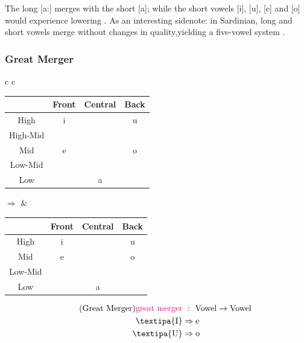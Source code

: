 \documentclass{report}[12pt]
\begin{document}
The long [a:] merges with the short [a]; while the short vowels [i], [u], [e] and [o] would experience lowering \parencite[p.~13]{romance_his}. As an interesting sidenote: in Sardinian, long and short vowels merge without changes in quality,yielding a five-vowel system \parencite[p.~112]{lloyd_spanish}.

\subsubsection{Great Merger}\label{sec:great_merger}

\begin{tcolorbox}
  \begin{tabular}{c c}
    \begin{tabular}{|c|c|c|c|}
      \hline
      & Front & Central & Back \\
      \hline
      High & i & & u \\
      \hline
      High-Mid & \cellcolor{gray} \textipa{I} & & \cellcolor{gray} \textipa{U} \\
      \hline
      Mid & e & & o \\
      \hline
      Low-Mid & \textipa{E} & & \textipa{O} \\
      \hline
      Low & & a & \\
      \hline
    \end{tabular}
    \quad $\Rightarrow$ &
                          \begin{tabular}{|c|c|c|c|}
                            \hline
                            & Front & Central & Back \\
                            \hline
                            High & i & & u \\
                            \hline
                            Mid & \cellcolor{magenta} e & & \cellcolor{magenta} o \\
                            \hline
                            Low-Mid & \textipa{E} & & \textipa{O} \\
                            \hline
                            Low & & a & \\
                            \hline
                          \end{tabular}
  \end{tabular}
  \tcblower
  \begin{align*}\tag{Great Merger}\label{eq:great_merger}
    \text{\textcolor{magenta}{great merger}} &\ :\ \text{Vowel} \rightarrow \text{Vowel} \\
    \text{\textipa{I}} & \Rightarrow \text{e} \\
    \text{\textipa{U}} & \Rightarrow \text{o} \\
  \end{align*}
\end{tcolorbox}
\end{document}
